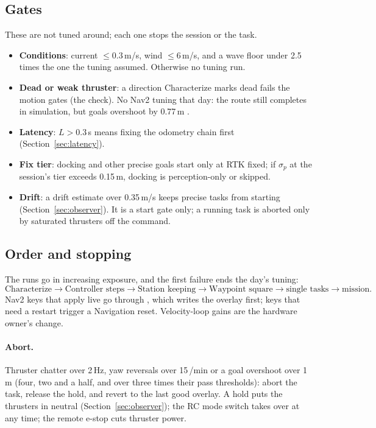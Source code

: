 \subsection{Gates}
These are not tuned around; each one stops the session or the task.
\begin{itemize}[leftmargin=*, itemsep=1pt]
\item \textbf{Conditions}: current $\le 0.3$\,m/s, wind $\le 6$\,m/s, and a wave floor under 2.5 times the
  one the tuning assumed. Otherwise no tuning run.
\item \textbf{Dead or weak thruster}: a direction Characterize marks dead fails the motion gates
  (the  check). No Nav2 tuning that day: the route still completes in simulation, but
  goals overshoot by 0.77\,m .
\item \textbf{Latency}: $L > 0.3$\,s means fixing the odometry chain first (Section~\ref{sec:latency}).
\item \textbf{Fix tier}: docking and other precise goals start only at RTK fixed; if $\sigma_p$ at the
  session's tier exceeds 0.15\,m, docking is perception-only or skipped.
\item \textbf{Drift}: a drift estimate over 0.35\,m/s keeps precise tasks from starting
  (Section~\ref{sec:observer}). It is a start gate only; a running task is aborted only by
  saturated thrusters off the command.
\end{itemize}

\subsection{Order and stopping}
The runs go in increasing exposure, and the first failure ends the day's tuning:
\[
  \text{Characterize} \to \text{Controller steps} \to \text{Station keeping} \to
  \text{Waypoint square} \to \text{single tasks} \to \text{mission}.
\]
Nav2 keys that apply live go through , which writes the
overlay first; keys that need a restart trigger a Navigation reset. Velocity-loop gains are the
hardware owner's change.

\paragraph{Abort.} Thruster chatter over 2\,Hz, yaw reversals over 15\,/min or a goal overshoot over
1\,m (four, two and a half, and over three times their pass thresholds): abort the task, release the hold, and
revert to the last good overlay. A hold puts the thrusters in neutral (Section~\ref{sec:observer});
the RC mode switch takes over at any time; the remote e-stop cuts thruster power.

